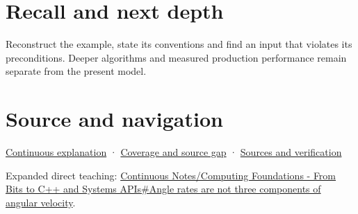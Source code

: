 \section{Recall and next depth}\label{appendix-5f723fbd0593-recall-and-next-depth}

Reconstruct the example, state its conventions and find an input that violates its preconditions. Deeper algorithms and measured production performance remain separate from the present model.

\section{Source and navigation}\label{appendix-5f723fbd0593-source-and-navigation}

\href{Continuous\%20Notes/Computing\%20Foundations\%20-\%20From\%20Bits\%20to\%20C++\%20and\%20Systems\%20APIs\#Keep\%20the\%20promises\%20visible\%20while\%20moving\%20between\%20representations}{Continuous explanation} · \hyperref[appendix-fd090d982a15-phase-7---parts-601-700]{Coverage and source gap} · \hyperref[appendix-a103e7846d21-phase-7---source-analysis-and-verification]{Sources and verification}

Expanded direct teaching: \href{Continuous\%20Notes/Computing\%20Foundations\%20-\%20From\%20Bits\%20to\%20C++\%20and\%20Systems\%20APIs\#Angle\%20rates\%20are\%20not\%20three\%20components\%20of\%20angular\%20velocity}{Continuous Notes/Computing Foundations - From Bits to C++ and Systems APIs\#Angle rates are not three components of angular velocity}.
